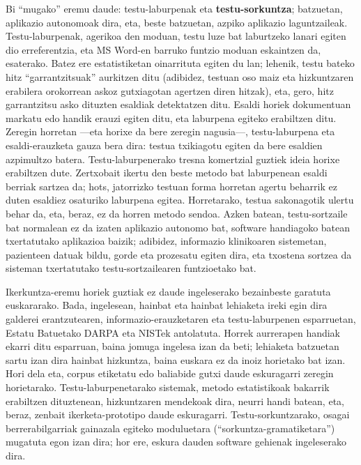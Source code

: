 \begin{multicols}{2}
Bi “mugako” eremu daude: testu-laburpenak eta \textbf{testu-sorkuntza}; batzuetan, aplikazio autonomoak dira, eta, beste batzuetan, azpiko aplikazio laguntzaileak. Testu-laburpenak, agerikoa den moduan, testu luze bat laburtzeko lanari egiten dio erreferentzia, eta MS Word-en barruko funtzio moduan eskaintzen da, esaterako. Batez ere estatistiketan oinarrituta egiten du lan; lehenik, testu bateko hitz “garrantzitsuak” aurkitzen ditu (adibidez, testuan oso maiz eta hizkuntzaren erabilera orokorrean askoz gutxiagotan agertzen diren hitzak), eta, gero, hitz garrantzitsu asko dituzten esaldiak detektatzen ditu. Esaldi horiek dokumentuan markatu edo handik erauzi egiten ditu, eta laburpena egiteko erabiltzen ditu. Zeregin horretan —eta horixe da bere zeregin nagusia—, testu-laburpena eta esaldi-erauzketa gauza bera dira: testua txikiagotu egiten da bere esaldien azpimultzo batera. Testu-laburpenerako tresna komertzial guztiek ideia horixe erabiltzen dute. Zertxobait ikertu den beste metodo bat laburpenean esaldi berriak sartzea da; hots, jatorrizko testuan forma horretan agertu beharrik ez duten esaldiez osaturiko laburpena egitea. Horretarako, testua sakonagotik ulertu behar da, eta, beraz, ez da horren metodo sendoa. Azken batean, testu-sortzaile bat normalean ez da izaten aplikazio autonomo bat, software handiagoko batean txertatutako aplikazioa baizik; adibidez, informazio klinikoaren sistemetan, pazienteen datuak bildu, gorde eta prozesatu egiten dira, eta txostena sortzea da sisteman txertatutako testu-sortzailearen funtzioetako bat. 


Ikerkuntza-eremu horiek guztiak ez daude ingeleserako bezainbeste garatuta euskararako. Bada, ingelesean, hainbat eta hainbat lehiaketa ireki egin dira galderei erantzutearen, informazio-erauzketaren eta testu-laburpenen esparruetan, Estatu Batuetako DARPA eta NISTek antolatuta. Horrek aurrerapen handiak ekarri ditu esparruan, baina jomuga ingelesa izan da beti; lehiaketa batzuetan sartu izan dira hainbat hizkuntza, baina euskara ez da inoiz horietako bat izan. Hori dela eta, corpus etiketatu edo baliabide gutxi daude eskuragarri zeregin horietarako. Testu-laburpenetarako sistemak, metodo estatistikoak bakarrik erabiltzen dituztenean, hizkuntzaren mendekoak dira, neurri handi batean, eta, beraz, zenbait ikerketa-prototipo daude eskuragarri. Testu-sorkuntzarako, osagai berrerabilgarriak gainazala egiteko moduluetara (“sorkuntza-gramatiketara”) mugatuta egon izan dira; hor ere, eskura dauden software gehienak ingeleserako dira. 


\end{multicols}
